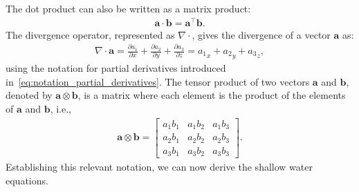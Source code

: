 The dot product can also be written as a matrix product:
\begin{align*}
    \mathbf{a} \cdot \mathbf{b} = \mathbf{a}^\top \mathbf{b}.
\end{align*}
The divergence operator, represented as $\nabla \cdot $, gives the divergence of a vector $\mathbf{a}$ as:
\begin{align*}
    \nabla \cdot \mathbf{a} = \frac{\partial a_1}{\partial x} + \frac{\partial a_2}{\partial y} + \frac{\partial a_3}{\partial z} = {a_1}_x + {a_2}_y + {a_3}_z,
\end{align*}
using the notation for partial derivatives introduced in~\eqref{eq:notation_partial_derivatives}.
The tensor product of two vectors $\mathbf{a}$ and $\mathbf{b}$, denoted by $\mathbf{a} \otimes \mathbf{b}$, is a matrix where each element is the product of the elements of $\mathbf{a}$ and $\mathbf{b}$, i.e.,
\begin{align*}
    \mathbf{a} \otimes \mathbf{b} = \begin{bmatrix}
        a_1 b_1 & a_1 b_2 & a_1 b_3 \\
        a_2 b_1 & a_2 b_2 & a_2 b_3 \\
        a_3 b_1 & a_3 b_2 & a_3 b_3
\end{bmatrix}.
\end{align*}
Establishing this relevant notation, we can now derive the shallow water equations.



 
